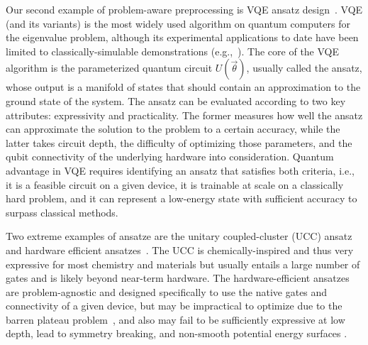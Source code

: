Our second example of problem-aware preprocessing is VQE ansatz design~\cite{peruzzo2014variational}.
VQE (and its variants) is the most widely used algorithm on quantum computers for the eigenvalue problem, although its experimental applications to date have been limited to classically-simulable demonstrations (e.g.,~\cite{du2010nmr,lanyon2010towards,peruzzo2014variational,wang2015quantum,omalley2016scalable,shen2017quantum,paesani2017bayesian,kandala2017hardware,hempel2018trappedion,santagati2018witnessing,dumitrescu2018atomicnucleus,kokail2019selfverifying,kandala2019errormitigation,ganzhorn2019gate,sagastizabal2019experimental,mccaskey2019quantum,smart2019quantum,liu2021representation,liu2023analytic,zheng2023speeding}).
The core of the VQE algorithm is the parameterized quantum circuit $U(\Vec{\theta})$, usually called the ansatz, whose output is a manifold of states that should contain an approximation to the ground state of the system.
The ansatz can be evaluated according to two key attributes: expressivity and practicality.
The former measures how well the ansatz can approximate the solution to the problem to a certain accuracy, while the latter takes circuit depth, the difficulty of optimizing those parameters, and the qubit connectivity of the underlying hardware into consideration.
Quantum advantage in VQE requires identifying an ansatz that satisfies both criteria, i.e., it is a feasible circuit on a given device, it is trainable at scale on a classically hard problem, and it can represent a low-energy state with sufficient accuracy to surpass classical methods.

Two extreme examples of ansatze are the unitary coupled-cluster (UCC) ansatz~\cite{peruzzo2014variational, shen2017quantum,nam2020trappedion,anand2022quantum} and hardware efficient ansatzes~\cite{kandala2017hardware}.
The UCC is chemically-inspired and thus very expressive for most chemistry and materials but usually entails a large number of gates and is likely beyond near-term hardware.
The hardware-efficient ansatzes are problem-agnostic and designed specifically to use the native gates and connectivity of a given device, but may be impractical to optimize due to the barren plateau problem~\cite{mcclean2018barren}, and also may fail to be sufficiently expressive at low depth, lead to symmetry breaking, and non-smooth potential energy surfaces \cite{d2023challenges}.

